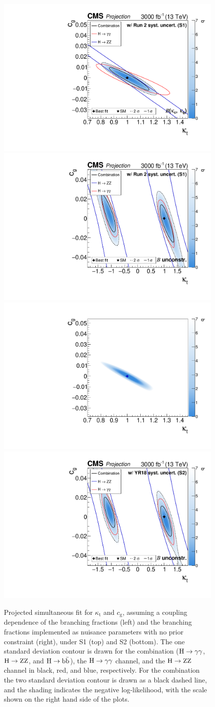 \begin{figure}[hbtp]
\begin{center}
{        }{
        \includegraphics[width=0.49\linewidth]{img/projections/projection_ktcg_plot_couplingdependentBRs.pdf}
        \includegraphics[width=0.49\linewidth]{img/projections/projection_ktcg_plot_floatingBRs.pdf}
        \includegraphics[width=0.49\linewidth]{img/projections/projection_ktcg_plot_couplingdependentBRs_scenario2.pdf}
        \includegraphics[width=0.49\linewidth]{img/projections/projection_ktcg_plot_floatingBRs_scenario2.pdf}
        }
    \caption{
        Projected simultaneous fit for $\kappa_\textrm{t}$ and $c_\textrm{g}$, assuming a coupling dependence of the branching fractions (left) and the branching fractions implemented as nuisance parameters with no prior constraint (right), under S1 (top) and S2 (bottom).
        The one standard deviation contour is drawn for the combination ($\mathrm{H}\to\mathrm{\gamma}\mathrm{\gamma}$, $\mathrm{H}\to\mathrm{Z}\mathrm{Z}$, and $\mathrm{H}\to\mathrm{b}\bar{\mathrm{b}}$), the $\mathrm{H}\to\mathrm{\gamma}\mathrm{\gamma}$ channel, and the $\mathrm{H}\to\mathrm{Z}\mathrm{Z}$ channel in black, red, and blue, respectively.
        For the combination the two standard deviation contour is drawn as a black dashed line, and the shading indicates the negative log-likelihood, with the scale shown on the right hand side of the plots.
        }
    \label{fig:proj_ktcg}
  \end{center}
\end{figure}

